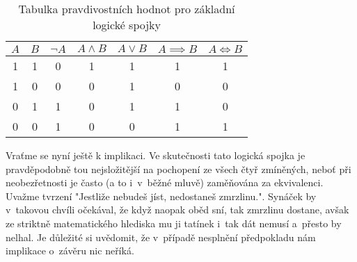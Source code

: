 \begin{table}[H]
    \centering
    \begin{tabular}{|cc|ccccc|}
    \hline
    $A$ & $B$ & $\neg A$ & $A \land B$ & $A \lor B$ & $A \implies B$ & $A \iff B$ \\ \hline
    1   & 1   & 0        & 1           & 1          & 1              & 1          \\
    1   & 0   & 0        & 0           & 1          & 0              & 0          \\
    0   & 1   & 1        & 0           & 1          & 1              & 0          \\
    0   & 0   & 1        & 0           & 0          & 1              & 1          \\ \hline
    \end{tabular}
    \caption{Tabulka pravdivostních hodnot pro základní logické spojky}
    \label{tab:logicke_spojky}
\end{table}
Vraťme se nyní ještě k implikaci. Ve skutečnosti tato logická spojka je pravděpodobně tou nejsložitější na pochopení ze všech čtyř zmíněných, neboť při neobezřetnosti je často (a to i~v~běžné mluvě) zaměňována za ekvivalenci. Uvažme tvrzení "Jestliže nebudeš jíst, nedostaneš zmrzlinu.". Synáček by v~takovou chvíli očekával, že když naopak oběd sní, tak zmrzlinu dostane, avšak ze striktně matematického hlediska mu ji tatínek i~tak dát nemusí a~přesto by nelhal. Je důležité si uvědomit, že v~případě nesplnění předpokladu nám implikace o~závěru nic neříká.\par

